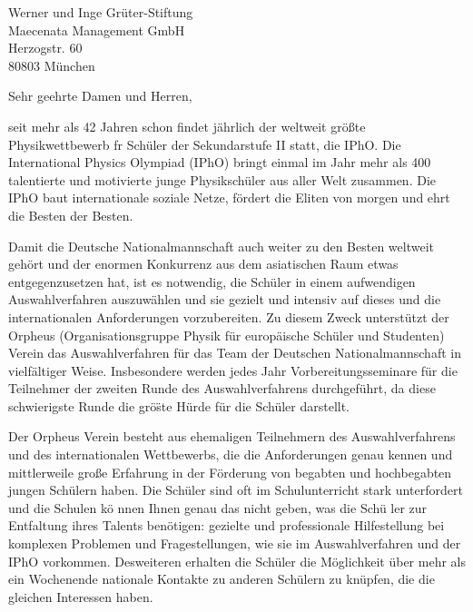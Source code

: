 \documentclass[../style/orpheus,fontsize=11pt]{scrlttr2}
\begin{document}

\begin{letter}{
\noindent Werner und Inge Gr\"uter-Stiftung \\
Maecenata Management GmbH \\
Herzogstr. 60\\
80803 M\"unchen
}



\opening{Sehr geehrte Damen und Herren,}

seit mehr als 42 Jahren schon findet j\"ahrlich der weltweit gr\"o\ss te Physikwettbewerb fr Sch\"uler der Sekundarstufe II statt, die IPhO.  Die International Physics Olympiad (IPhO) bringt einmal im Jahr mehr als 400 talentierte und motivierte junge Physiksch\"uler aus aller Welt zusammen.  Die IPhO baut internationale soziale Netze, f\"ordert die Eliten von morgen und ehrt die Besten der Besten.

Damit die Deutsche Nationalmannschaft auch weiter zu den Besten weltweit geh\"ort und der enormen Konkurrenz aus dem asiatischen Raum etwas entgegenzusetzen hat, ist es notwendig, die Sch\"uler in einem aufwendigen Auswahlverfahren auszuw\"ahlen und sie gezielt und intensiv auf dieses und die internationalen Anforderungen vorzubereiten.  Zu diesem Zweck unterst\"utzt der Orpheus (Organisationsgruppe Physik f\"ur europ\"aische Sch\"uler und Studenten) Verein das Auswahlverfahren f\"ur das Team der Deutschen Nationalmannschaft in vielf\"altiger Weise.  Insbesondere werden jedes Jahr Vorbereitungsseminare f\"ur die Teilnehmer der zweiten Runde des Auswahlverfahrens durchgef\"uhrt, da diese schwierigste Runde die gr\"o\"ste H\"urde f\"ur die Sch\"uler darstellt.

Der Orpheus Verein besteht aus ehemaligen Teilnehmern des Auswahlverfahrens und des internationalen Wettbewerbs, die die Anforderungen genau kennen und mittlerweile gro\ss e Erfahrung in der F\"orderung von begabten und hochbegabten jungen Sch\"ulern haben.  Die Sch\"uler sind oft im Schulunterricht stark unterfordert und die Schulen k\"o nnen Ihnen genau das nicht geben, was die Sch\"u ler zur Entfaltung ihres Talents ben\"otigen: gezielte und professionale Hilfestellung bei komplexen Problemen und Fragestellungen, wie sie im Auswahlverfahren und der IPhO vorkommen.  Desweiteren erhalten die Sch\"uler die M\"oglichkeit \"uber mehr als ein Wochenende nationale Kontakte zu anderen Sch\"ulern zu kn\"upfen, die die gleichen Interessen haben.


\end{letter}
\end{document}
